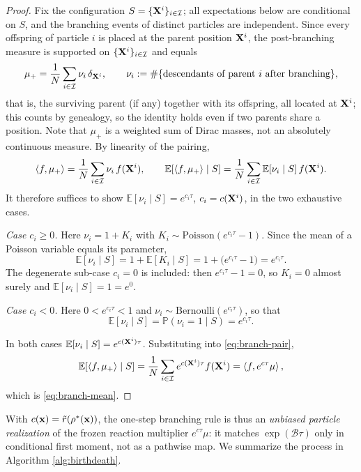 \documentclass[a4paper,fleqn]{cas-sc}
\theoremstyle{definition}
\theoremstyle{remark}
\begin{document}
\begin{proof}
Fix the configuration $S=\{\mathbf{X}^i\}_{i\in\mathcal I}$; all expectations below are conditional on
$S$, and the branching events of distinct particles are independent. Since every offspring of
particle $i$ is placed at the parent position $\mathbf{X}^i$, the post-branching measure is supported on
$\{\mathbf{X}^i\}_{i\in\mathcal I}$ and equals
\begin{equation}\label{eq:mu-plus-nu}
\mu_+=\frac1N\sum_{i\in\mathcal I}\nu_i\,\delta_{\mathbf{X}^i},
\qquad
\nu_i:=\#\{\text{descendants of parent }i\text{ after branching}\},
\end{equation}
that is, the surviving parent (if any) together with its offspring, all located at $\mathbf{X}^i$;
this counts by genealogy, so the identity holds even if two parents share a position.
Note that $\mu_+$ is a weighted sum of Dirac masses, not an absolutely continuous measure. By
linearity of the pairing,
\begin{equation}\label{eq:branch-pair}
\left<f,\mu_+\right>=\frac1N\sum_{i\in\mathcal I}\nu_i\,f(\mathbf{X}^i),
\qquad
\mathbb E\!\left[\left<f,\mu_+\right>\mid S\right]
=\frac1N\sum_{i\in\mathcal I}\mathbb E[\nu_i\mid S]\,f(\mathbf{X}^i).
\end{equation}
It therefore suffices to show $\mathbb E[\nu_i\mid S]=e^{c_i\tau}$, $c_i=c(\mathbf{X}^i)$, in the two
exhaustive cases.

\emph{Case $c_i\ge0$.} Here $\nu_i=1+K_i$ with $K_i\sim\mathrm{Poisson}(e^{c_i\tau}-1)$. Since the
mean of a Poisson variable equals its parameter,
\begin{equation}
\mathbb E[\nu_i\mid S]=1+\mathbb E[K_i\mid S]=1+\bigl(e^{c_i\tau}-1\bigr)=e^{c_i\tau}.
\end{equation}
The degenerate sub-case $c_i=0$ is included: then $e^{c_i\tau}-1=0$, so $K_i=0$ almost surely and
$\mathbb E[\nu_i\mid S]=1=e^{0}$.

\emph{Case $c_i<0$.} Here $0<e^{c_i\tau}<1$ and $\nu_i\sim\mathrm{Bernoulli}(e^{c_i\tau})$, so that
\begin{equation}
\mathbb E[\nu_i\mid S]=\mathbb P(\nu_i=1\mid S)=e^{c_i\tau}.
\end{equation}

In both cases $\mathbb E[\nu_i\mid S]=e^{c(\mathbf{X}^i)\tau}$. Substituting into \eqref{eq:branch-pair},
\begin{equation}
\mathbb E\!\left[\left<f,\mu_+\right>\mid S\right]
=\frac1N\sum_{i\in\mathcal I}e^{c(\mathbf{X}^i)\tau}f(\mathbf{X}^i)
=\left<f,e^{c\tau}\mu\right>,
\end{equation}
which is \eqref{eq:branch-mean}.
\end{proof}
With $c(\mathbf x) = \tilde{r}(\rho^{\ast}(\mathbf x))$, the one-step branching rule is thus an
\emph{unbiased particle realization} of the frozen reaction multiplier $e^{c\tau}\mu$: it
matches $\exp(\mathcal B\tau)$ only in conditional first moment, not as a pathwise map. We
summarize the process in Algorithm \ref{alg:birthdeath}.
\end{document}
